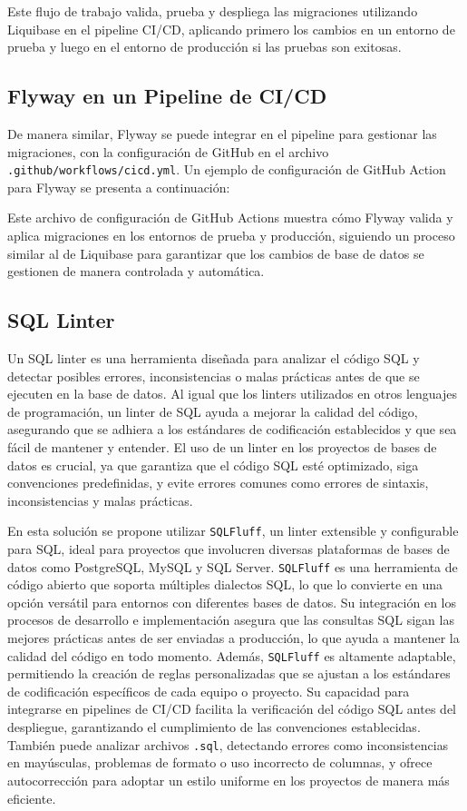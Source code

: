 \documentclass{IEEEtran}
\begin{document}
Este flujo de trabajo valida, prueba y despliega las migraciones utilizando Liquibase en el pipeline CI/CD, aplicando primero los cambios en un entorno de prueba y luego en el entorno de producción si las pruebas son exitosas.

\subsection{Flyway en un Pipeline de CI/CD}
De manera similar, Flyway se puede integrar en el pipeline para gestionar las migraciones, con la configuración de GitHub en el archivo \texttt{.github/workflows/cicd.yml}. Un ejemplo de configuración de GitHub Action para Flyway se presenta a continuación:


Este archivo de configuración de GitHub Actions muestra cómo Flyway valida y aplica migraciones en los entornos de prueba y producción, siguiendo un proceso similar al de Liquibase para garantizar que los cambios de base de datos se gestionen de manera controlada y automática.

\subsection{SQL Linter}

Un SQL linter es una herramienta diseñada para analizar el código SQL y detectar posibles errores, inconsistencias o malas prácticas antes de que se ejecuten en la base de datos. Al igual que los linters utilizados en otros lenguajes de programación, un linter de SQL ayuda a mejorar la calidad del código, asegurando que se adhiera a los estándares de codificación establecidos y que sea fácil de mantener y entender. El uso de un linter en los proyectos de bases de datos es crucial, ya que garantiza que el código SQL esté optimizado, siga convenciones predefinidas, y evite errores comunes como errores de sintaxis, inconsistencias y malas prácticas.

En esta solución se propone utilizar \texttt{SQLFluff}, un linter extensible y configurable para SQL, ideal para proyectos que involucren diversas plataformas de bases de datos como PostgreSQL, MySQL y SQL Server. \texttt{SQLFluff} es una herramienta de código abierto que soporta múltiples dialectos SQL, lo que lo convierte en una opción versátil para entornos con diferentes bases de datos. Su integración en los procesos de desarrollo e implementación asegura que las consultas SQL sigan las mejores prácticas antes de ser enviadas a producción, lo que ayuda a mantener la calidad del código en todo momento. Además, \texttt{SQLFluff} es altamente adaptable, permitiendo la creación de reglas personalizadas que se ajustan a los estándares de codificación específicos de cada equipo o proyecto. Su capacidad para integrarse en pipelines de CI/CD facilita la verificación del código SQL antes del despliegue, garantizando el cumplimiento de las convenciones establecidas. También puede analizar archivos \texttt{.sql}, detectando errores como inconsistencias en mayúsculas, problemas de formato o uso incorrecto de columnas, y ofrece autocorrección para adoptar un estilo uniforme en los proyectos de manera más eficiente.
\end{document}
